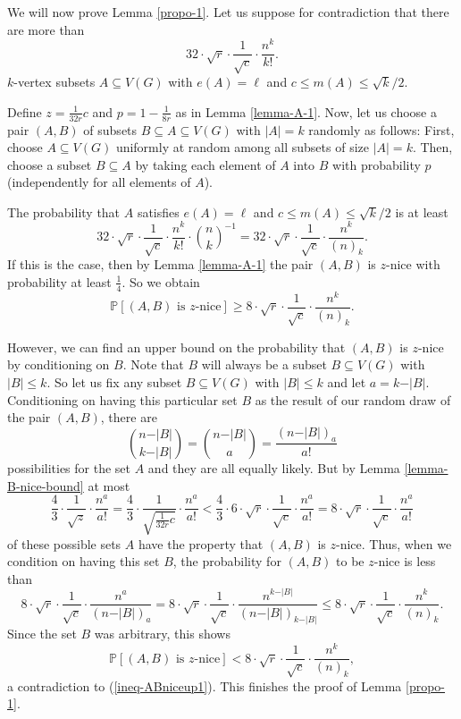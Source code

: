 We will now prove Lemma \ref{propo-1}. Let us suppose for contradiction that there are more than
\[32\cdot\sqrt{r}\cdot \frac{1}{\sqrt{c}}\cdot \frac{n^k}{k!}.\]
$k$-vertex subsets $A\subseteq V(G)$ with $e(A)=\ell$ and $c\leq m(A)\leq \sqrt{k}/2$. 

Define $z=\frac{1}{32r}c$ and $p=1-\frac{1}{8r}$ as in Lemma \ref{lemma-A-1}. Now, let us choose a pair $(A,B)$ of subsets $B\subseteq A\subseteq V(G)$ with $\vert A\vert=k$ randomly as follows: First, choose $A\subseteq V(G)$ uniformly at random among all subsets of size $\vert A\vert=k$. Then, choose a subset $B\subseteq A$ by taking each element of $A$ into $B$ with probability $p$ (independently for all elements of $A$).

The probability that $A$ satisfies $e(A)=\ell$ and $c\leq m(A)\leq \sqrt{k}/2$ is at least
\[32\cdot\sqrt{r}\cdot \frac{1}{\sqrt{c}}\cdot \frac{n^k}{k!}\cdot {n\choose k}^{-1}=32\cdot\sqrt{r}\cdot \frac{1}{\sqrt{c}}\cdot\frac{n^k}{(n)_k}.\]
If this is the case, then by Lemma \ref{lemma-A-1} the pair $(A,B)$ is $z$-nice with probability at least $\frac{1}{4}$. So we obtain
\begin{equation}\label{ineq-ABniceup1}
\mathbb{P}[(A,B)\text{ is }z\text{-nice}]\geq 8\cdot\sqrt{r}\cdot \frac{1}{\sqrt{c}}\cdot\frac{n^k}{(n)_k}.
\end{equation}

However, we can find an upper bound on the probability that $(A,B)$ is $z$-nice by conditioning on $B$. Note that $B$ will always be a subset $B\subseteq V(G)$ with $\vert B\vert \leq k$. So let us fix any subset $B\subseteq V(G)$ with $\vert B\vert \leq k$ and let $a=k-\vert B\vert$. Conditioning on having this particular set $B$ as the result of our random draw of the pair $(A,B)$, there are
\[{n-\vert B\vert\choose k-\vert B\vert}={n-\vert B\vert\choose a}=\frac{(n-\vert B\vert)_a}{a!}\]
possibilities for the set $A$ and they are all equally likely. But by Lemma \ref{lemma-B-nice-bound} at most
\[\frac{4}{3}\cdot\frac{1}{\sqrt{z}}\cdot \frac{n^a}{a!}=\frac{4}{3}\cdot\frac{1}{\sqrt{\frac{1}{32r}c}}\cdot \frac{n^a}{a!}< \frac{4}{3}\cdot 6\cdot \sqrt{r}\cdot\frac{1}{\sqrt{c}}\cdot \frac{n^a}{a!}=8\cdot \sqrt{r}\cdot\frac{1}{\sqrt{c}}\cdot \frac{n^a}{a!}\]
of these possible sets $A$ have the property that $(A,B)$ is $z$-nice. Thus, when we condition on having this set $B$, the probability for $(A,B)$ to be $z$-nice is less than
\[8\cdot \sqrt{r}\cdot\frac{1}{\sqrt{c}}\cdot \frac{n^a}{(n-\vert B\vert)_a}=
8\cdot \sqrt{r}\cdot\frac{1}{\sqrt{c}}\cdot \frac{n^{k-\vert B\vert}}{(n-\vert B\vert)_{k-\vert B\vert}}\leq 8\cdot \sqrt{r}\cdot\frac{1}{\sqrt{c}}\cdot \frac{n^k}{(n)_k}.\]
Since the set $B$ was arbitrary, this shows
\[\mathbb{P}[(A,B)\text{ is }z\text{-nice}]<8\cdot \sqrt{r}\cdot\frac{1}{\sqrt{c}}\cdot \frac{n^k}{(n)_k},\]
a contradiction to (\ref{ineq-ABniceup1}). This finishes the proof of Lemma \ref{propo-1}.

